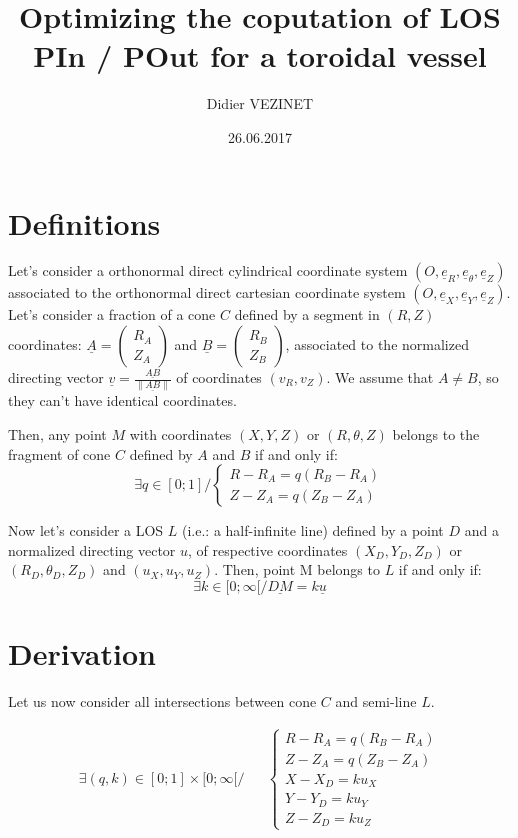 \documentclass[a4paper,11pt,twoside,titlepage,openright]{book}
\numberwithin{equation}{section}
\newcommand{\ud}[1]{\underline{#1}}
\begin{document}
\title{Optimizing the coputation of LOS PIn / POut for a toroidal vessel} 
\author{Didier VEZINET}
\date{26.06.2017}
\maketitle

\tableofcontents

\chapter{Definitions}

Let's consider a orthonormal direct cylindrical coordinate system $(O,\ud{e}_R,\ud{e}_{\theta},\ud{e}_Z)$ associated to the orthonormal direct cartesian coordinate system $(O,\ud{e}_X,\ud{e}_Y,\ud{e}_Z)$.
Let's consider a fraction of a cone $C$ defined by a segment in $(R,Z)$ coordinates: $\ud{A}=\left(\begin{array}{cc}R_A\\Z_A\end{array}\right)$ and $\ud{B}=\left(\begin{array}{cc}R_B\\Z_B\end{array}\right)$, associated to the normalized directing vector $\ud{v}=\frac{\ud{AB}}{\|\ud{AB}\|}$ of coordinates $(v_R,v_Z)$.
We assume that $A\neq B$, so they can't have identical coordinates.


Then, any point $M$ with coordinates $(X,Y,Z)$ or $(R,\theta,Z)$ belongs to the fragment of cone $C$ defined by $A$ and $B$ if and only if:
$$
\exists q \in [0;1] / 
\left\{ \begin{array}{ll}
R-R_A = q(R_B-R_A)\\
Z-Z_A = q(Z_B-Z_A)
\end{array}\right.
$$


Now let's consider a LOS $L$ (i.e.: a half-infinite line) defined by a point $D$ and a normalized directing vector $u$, of respective coordinates $(X_D,Y_D,Z_D)$ or $(R_D,\theta_D,Z_D)$ and $(u_X,u_Y,u_Z)$.
Then, point M belongs to $L$ if and only if:
$$
\exists k \in [0;\infty[ / \ud{DM} = k\ud{u}
$$


\chapter{Derivation}

Let us now consider all intersections between cone $C$ and semi-line $L$.

$$
\begin{array}{lll}
\exists (q,k) \in [0;1]\times [0;\infty[ /& & 
\left\{\begin{array}{ll}
R-R_A = q(R_B-R_A)\\
Z-Z_A = q(Z_B-Z_A)\\
X-X_D = ku_X\\
Y-Y_D = ku_Y\\
Z-Z_D = ku_Z
\end{array}\right.\\
\end{array}
$$
\end{document}
